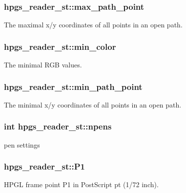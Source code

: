\subsubsection[{max\_\-path\_\-point}]{ {\bf hpgs\_\-reader\_\-st::max\_\-path\_\-point}}\label{structhpgs__reader__st_a43c54bdd07dbf56fb8f8d3ce073fb4c0}
The maximal x/y coordinates of all points in an open path. 
\subsubsection[{min\_\-color}]{ {\bf hpgs\_\-reader\_\-st::min\_\-color}}\label{structhpgs__reader__st_a1024bff0bc3ef54be296c6e98e4cf202}
The minimal RGB values. 
\subsubsection[{min\_\-path\_\-point}]{ {\bf hpgs\_\-reader\_\-st::min\_\-path\_\-point}}\label{structhpgs__reader__st_a88d31f257c371acf55cc45c3537f5b4e}
The minimal x/y coordinates of all points in an open path. 
\subsubsection[{npens}]{\setlength{\rightskip}{0pt plus 5cm}int {\bf hpgs\_\-reader\_\-st::npens}}\label{structhpgs__reader__st_acbb97d4f9a7d2500c1068177fb1feb32}
pen settings 
\subsubsection[{P1}]{ {\bf hpgs\_\-reader\_\-st::P1}}\label{structhpgs__reader__st_aee7c95228a9ca69f97bebf9f05323ae1}
HPGL frame point P1 in PostScript pt (1/72 inch). 
